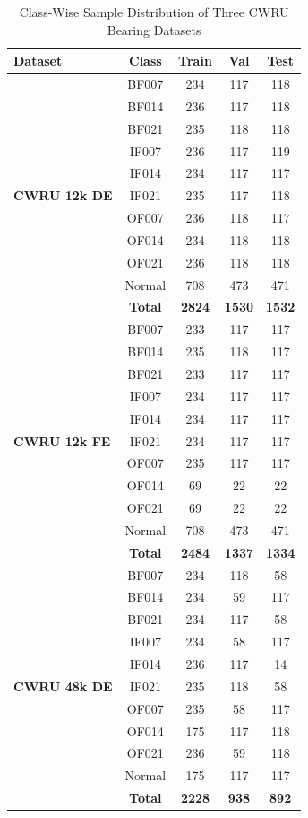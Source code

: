 \documentclass[pdflatex,sn-mathphys-num]{sn-jnl}
\theoremstyle{thmstyleone}%
\theoremstyle{thmstyletwo}%
\theoremstyle{thmstylethree}%
\begin{document}
\begin{table}[!t]
\caption{Class-Wise Sample Distribution of Three CWRU Bearing Datasets\label{tab:datasets_comprehensive}}
\centering
\renewcommand{\arraystretch}{1.0}
\setlength{\tabcolsep}{5pt}
\begin{tabular}{lcccc}
\toprule
\textbf{Dataset} & \textbf{Class} & \textbf{Train} & \textbf{Val} & \textbf{Test} \\
\midrule
\multirow{11}{*}{\textbf{CWRU 12k DE}} 
& BF007  & 234 & 117 & 118 \\
& BF014  & 236 & 117 & 118 \\
& BF021  & 235 & 118 & 118 \\
& IF007  & 236 & 117 & 119 \\
& IF014  & 234 & 117 & 117 \\
& IF021  & 235 & 117 & 118 \\
& OF007  & 236 & 118 & 117 \\
& OF014  & 234 & 118 & 118 \\
& OF021  & 236 & 118 & 118 \\
& Normal & 708 & 473 & 471 \\
& \textbf{Total} & \textbf{2824} & \textbf{1530} & \textbf{1532} \\
\midrule
\multirow{11}{*}{\textbf{CWRU 12k FE}} 
& BF007  & 233 & 117 & 117 \\
& BF014  & 235 & 118 & 117 \\
& BF021  & 233 & 117 & 117 \\
& IF007  & 234 & 117 & 117 \\
& IF014  & 234 & 117 & 117 \\
& IF021  & 234 & 117 & 117 \\
& OF007  & 235 & 117 & 117 \\
& OF014  & 69  & 22  & 22  \\
& OF021  & 69  & 22  & 22  \\
& Normal & 708 & 473 & 471 \\
& \textbf{Total} & \textbf{2484} & \textbf{1337} & \textbf{1334} \\
\midrule
\multirow{11}{*}{\textbf{CWRU 48k DE}} 
& BF007  & 234 & 118 & 58  \\
& BF014  & 234 & 59  & 117 \\
& BF021  & 234 & 117 & 58  \\
& IF007  & 234 & 58  & 117 \\
& IF014  & 236 & 117 & 14  \\
& IF021  & 235 & 118 & 58  \\
& OF007  & 235 & 58  & 117 \\
& OF014  & 175 & 117 & 118 \\
& OF021  & 236 & 59  & 118 \\
& Normal & 175 & 117 & 117 \\
& \textbf{Total} & \textbf{2228} & \textbf{938}  & \textbf{892}  \\
\bottomrule
\end{tabular}
\end{table}
\end{document}

